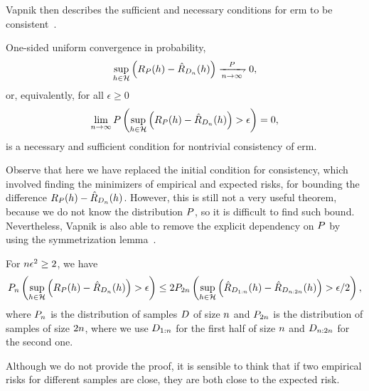 Vapnik then describes the sufficient and necessary conditions for \acrshort{erm} to be consistent~\citep{Vapnik00}.
\begin{theorem}
    One-sided uniform convergence in probability, 
    \begin{equation}
        \nonumber
        \sup_{\hypf \in \hypspace} \left(\exprisk(\hypf) - \empriskn(\hypf) \right) \xrightharpoondown[\nsamples \to \infty]{\distf}  0,
    \end{equation}    
    or, equivalently, for all $\epsilon \geq 0$
    \begin{equation}
        \nonumber
        \lim_{n \to \infty} P\left(\sup_{h \in \mathcal{H}} \left(R_P(h) - \hat{R}_{D_{n}}(h) \right) > \epsilon \right) = 0,
    \end{equation}
    is a necessary and sufficient condition for nontrivial consistency of \acrshort{erm}.
\end{theorem}
Observe that here we have replaced the initial condition for consistency, which involved finding the minimizers of empirical and expected risks, for bounding the difference $R_P(h) - \hat{R}_{D_{n}}(h)$.
However, this is still not a very useful theorem, because we do not know the distribution $P$, so it is difficult to find such bound.
Nevertheless, Vapnik is also able to remove the explicit dependency on $P$ by using the symmetrization lemma~\citep{vapnik1982estimation}.
\begin{lemma}[Symmetrization]\label{lemma:symetrization}
    For $n \epsilon^2 \geq 2$, we have 
    \begin{equation}
        \nonumber
        P_{n}\left(\sup_{h \in \mathcal{H}} \left(R_P(h) - \hat{R}_{D_{n}}(h) \right) > \epsilon \right) 
        \leq 
        2P_{2 n} \left(\sup_{h \in \mathcal{H}} \left(\hat{R}_{D_{1:n}}(h) - \hat{R}_{D_{n: 2n}}(h) \right) > \epsilon/2 \right),
    \end{equation}
    where $P_{n}$ is the distribution of samples $D$ of size $n$ and $P_{2 n}$ is the distribution of samples of size $2 n$, where we use $D_{1:n}$ for the first half of size $n$ and $D_{n: 2n}$ for the second one.
\end{lemma}
Although we do not provide the proof, it is sensible to think that if two empirical risks for different samples are close, they are both close to the expected risk.
